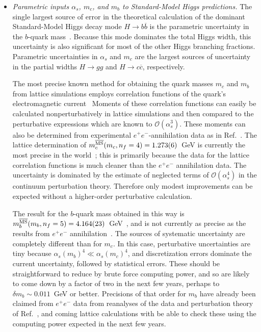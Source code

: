 \begin{itemize}

\item {\it Parametric inputs $\alpha_s$, $m_c$, and $m_b$ to Standard-Model
Higgs predictions.}  The single largest source of error in the theoretical
calculation of the dominant Standard-Model Higgs decay mode $H\rightarrow
b\overline{b}$ is the parametric uncertainty in the $b$-quark
mass~\cite{Denner:2011mq}.  Because this mode dominates the total Higgs width,
this uncertainty is also significant for most of the other Higgs branching
fractions.  Parametric uncertainties in $\alpha_s$ and $m_c$ are the largest
sources of uncertainty in the partial widths $H\rightarrow gg$ and
$H\rightarrow c\overline{c}$, respectively.
 
The most precise known method for obtaining the quark masses $m_c$ and $m_b$
from lattice simulations employs correlation functions of the quark's
electromagnetic current~\cite{Allison:2008xk,McNeile:2010ji} Moments of these
correlation functions can easily be calculated nonperturbatively in lattice
simulations and then compared to the perturbative expressions which are known
to ${\mathcal O}(\alpha_s^3)$.  These moments can also be determined from
experimental $e^+e^-$-annihilation data as in Ref.~\cite{Chetyrkin:2009fv}.
The lattice determination of $m_c^{\overline{\rm MS}}(m_c,n_f=4)=
1.273(6)$~GeV is currently the most precise in the
world~\cite{Beringer:1900zz}; this is primarily because the data for the
lattice correlation functions is much cleaner than the $e^+e^-$ annihilation
data.  The uncertainty is dominated by the estimate of neglected terms of
${\mathcal O}(\alpha_s^4)$ in the continuum perturbation theory.  Therefore
only modest improvements can be expected without a higher-order perturbative
calculation.

The result for the $b$-quark mass obtained in this way is $m_b^{\overline{\rm
MS}}(m_b, n_f=5) = 4.164(23)$~GeV~\cite{McNeile:2010ji}, and is not currently
as precise as the results from $e^+e^-$
annihilation~\cite{Chetyrkin:2009fv,Beringer:1900zz}.  The sources of
systematic uncertainty are completely different than for $m_c$.  In this case,
perturbative uncertainties are tiny because $\alpha_s(m_b)^4 \ll
\alpha_s(m_c)^4$, and discretization errors dominate the current uncertainty,
followed by statistical errors.  These should be straightforward to reduce by
brute force computing power, and so are likely to come down by a factor of two
in the next few years, perhaps to $\delta m_b \sim 0.011$~GeV or better.
Precisions of that order for $m_b$ have already been claimed from $e^+e^-$
data from reanalyses of the data and perturbation theory of
Ref.~\cite{Chetyrkin:2009fv}, and coming lattice calculations with be able to
check these using the computing power expected in the next few years.
 

\end{itemize}
